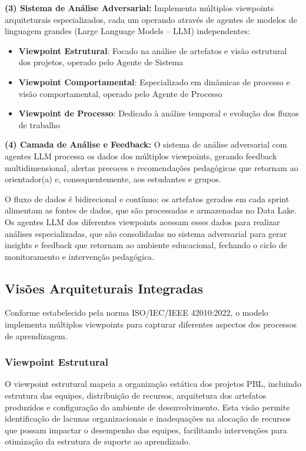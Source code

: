 \documentclass[english, spanish, brazilian]{modelo_dt}
\begin{document}
\textbf{(3) Sistema de Análise Adversarial:} Implementa múltiplos viewpoints arquiteturais especializados, cada um operando através de agentes de modelos de linguagem grandes (Large Language Models -- LLM) independentes:
\begin{itemize}
  \item \textbf{Viewpoint Estrutural}: Focado na análise de artefatos e visão estrutural dos projetos, operado pelo Agente de Sistema
  \item \textbf{Viewpoint Comportamental}: Especializado em dinâmicas de processo e visão comportamental, operado pelo Agente de Processo
  \item \textbf{Viewpoint de Processo}: Dedicado à análise temporal e evolução dos fluxos de trabalho
\end{itemize}

\textbf{(4) Camada de Análise e Feedback:} O sistema de análise adversarial com agentes LLM processa os dados dos múltiplos viewpoints, gerando feedback multidimensional, alertas precoces e recomendações pedagógicas que retornam ao orientador(a) e, consequentemente, aos estudantes e grupos\@.

O fluxo de dados é bidirecional e contínuo: os artefatos gerados em cada sprint
alimentam as fontes de dados, que são processadas e armazenadas no Data Lake.
Os agentes LLM dos diferentes viewpoints acessam esses dados para realizar
análises especializadas, que são consolidadas no sistema adversarial para gerar
insights e feedback que retornam ao ambiente educacional, fechando o ciclo de
monitoramento e intervenção pedagógica\@.

\subsection{Visões Arquiteturais Integradas}

Conforme estabelecido pela norma ISO/IEC/IEEE 42010:2022, o modelo implementa
múltiplos viewpoints para capturar diferentes aspectos dos processos de
aprendizagem\@.

\subsubsection{Viewpoint Estrutural}

O viewpoint estrutural mapeia a organização estática dos projetos PBL,
incluindo estrutura das equipes, distribuição de recursos, arquitetura dos
artefatos produzidos e configuração do ambiente de desenvolvimento\@. Esta
visão permite identificação de lacunas organizacionais e inadequações na
alocação de recursos que possam impactar o desempenho das equipes, facilitando
intervenções para otimização da estrutura de suporte ao aprendizado\@.
\end{document}
